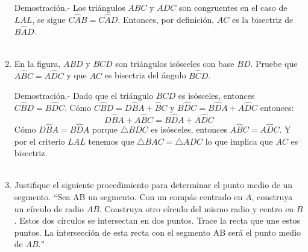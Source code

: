 \begin{enumerate}
	Demostración.-\; Los triángulos $ABC$ y $ADC$ son congruentes en el caso de $LAL$, se sigue $C\widehat{A}B = C\widehat{A}D$. Entonces, por definición, $AC$ es la bisectriz de $B\widehat{A}D$.\\\\

	\item En la figura, $ABD$ y $BCD$ son triángulos isósceles con base $BD$. Pruebe que $A\widehat{B}C=A\widehat{D}C$ y que $AC$ es bisectriz del ángulo $B\widehat{C}D$.

	\begin{center}
	\end{center}

	Demostración.-\; Dado que el triángulo $BCD$ es isósceles, entonces $C\widehat{B}D = B\widehat{D}C$. Cómo $C\widehat{B}D = D\widehat{B}A + \widehat{B}C$ y $B\widehat{D}C = B\widehat{D}A + A\widehat{D}C$ entonces: $$D\widehat{B}A + A\widehat{B}C = B\widehat{D}A + A\widehat{D}C$$ Cómo $D\widehat{B}A = B\widehat{D}A$ porque  $\triangle BDC$ es isósceles, entonces $A\widehat{B}C = A\widehat{D}C$. Y por el criterio $LAL$ tenemos que $\triangle BAC = \triangle ADC$ lo que implica que $AC$ es bisectriz.\\\\

	\item Justifique el siguiente procedimiento para determinar el punto medio de un segmento. $“$Sea AB un segmento. Con un compás centrado en $A$, construya un círculo de radio $AB$. Construya otro círculo del mismo radio y centro en $B$. Estos dos círculos se intersectan en dos puntos. Trace la recta que une estos puntos. La intersección de esta recta con el segmento AB será el punto medio de $AB$.$”$

	\begin{center}
	\end{center}


\end{enumerate}
